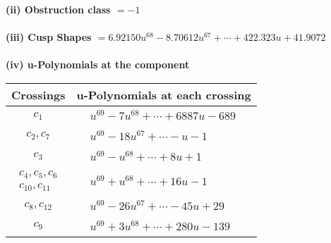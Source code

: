 \documentclass[1p]{elsarticle_modified}
\theoremstyle{definition}
\begin{document}
\flushleft \textbf{(ii) Obstruction class $= -1$}\\~\\
\flushleft \textbf{(iii) Cusp Shapes $= 6.92150 u^{68}-8.70612 u^{67}+\cdots+422.323 u+41.9072$}\\~\\
\newpage\renewcommand{\arraystretch}{1}
\flushleft \textbf{(iv) u-Polynomials at the component}\newline \\
\begin{tabular}{m{50pt}|m{274pt}}
Crossings & \hspace{64pt}u-Polynomials at each crossing \\
\hline $$\begin{aligned}c_{1}\end{aligned}$$&$\begin{aligned}
&u^{69}-7 u^{68}+\cdots+6887 u-689
\end{aligned}$\\
\hline $$\begin{aligned}c_{2},c_{7}\end{aligned}$$&$\begin{aligned}
&u^{69}-18 u^{67}+\cdots- u-1
\end{aligned}$\\
\hline $$\begin{aligned}c_{3}\end{aligned}$$&$\begin{aligned}
&u^{69}- u^{68}+\cdots+8 u+1
\end{aligned}$\\
\hline $$\begin{aligned}c_{4},c_{5},c_{6}\\c_{10},c_{11}\end{aligned}$$&$\begin{aligned}
&u^{69}+u^{68}+\cdots+16 u-1
\end{aligned}$\\
\hline $$\begin{aligned}c_{8},c_{12}\end{aligned}$$&$\begin{aligned}
&u^{69}-26 u^{67}+\cdots-45 u+29
\end{aligned}$\\
\hline $$\begin{aligned}c_{9}\end{aligned}$$&$\begin{aligned}
&u^{69}+3 u^{68}+\cdots+280 u-139
\end{aligned}$\\
\hline
\end{tabular}\\~\\
\end{document}
